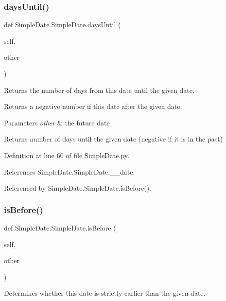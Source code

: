 \subsubsection{\texorpdfstring{days\+Until()}{daysUntil()}}
{\footnotesize\ttfamily def Simple\+Date.\+Simple\+Date.\+days\+Until (\begin{DoxyParamCaption}\item[{}]{self,  }\item[{}]{other }\end{DoxyParamCaption})}



Returns the number of days from this date until the given date. 

Returns a negative number if this date after the given date. 
\begin{DoxyParams}{Parameters}
{\em other} & the future date \\
\hline
\end{DoxyParams}
\begin{DoxyReturn}{Returns}
number of days until the given date (negative if it is in the past) 
\end{DoxyReturn}


Definition at line 60 of file Simple\+Date.\+py.



References Simple\+Date.\+Simple\+Date.\+\_\+\+\_\+date.



Referenced by Simple\+Date.\+Simple\+Date.\+is\+Before().

\mbox{\label{classSimpleDate_1_1SimpleDate_a3f991d5bf914be8175808732a37296c4}} 
\subsubsection{\texorpdfstring{is\+Before()}{isBefore()}}
{\footnotesize\ttfamily def Simple\+Date.\+Simple\+Date.\+is\+Before (\begin{DoxyParamCaption}\item[{}]{self,  }\item[{}]{other }\end{DoxyParamCaption})}



Determines whether this date is strictly earlier than the given date. 


